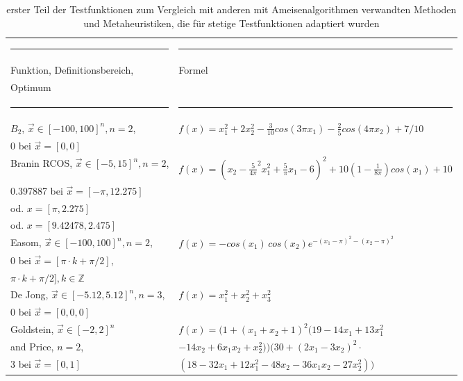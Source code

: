 \documentclass[fontsize=12, a4aper]{scrartcl}
\newcommand\Tstrut{\rule{0pt}{3ex}}           %
\begin{document}
	\begin{table}[H]
		
		\fontsize{10pt}{12pt}
		
		\caption{erster Teil der Testfunktionen zum Vergleich mit anderen mit Ameisenalgorithmen verwandten Methoden und Metaheuristiken, die für stetige Testfunktionen adaptiert wurden}
		
		\label{subsec:Stetige_Testfunktionen:tab:Teil_1_Stet_Adapt}
		
		\begin{tabularx}{\textwidth}{l|l}
			
			\rule{6cm}{0.4pt} & \rule{9cm}{0.4pt}\\
			
			Funktion, Definitionsbereich, & Formel\\
			Optimum & \\
			
			\rule{6cm}{0.4pt} & \rule{9cm}{0.4pt}\\
			
			\(B_2\), \(\overrightarrow{x} \in [-100,100]^n, n = 2\), & \(f(x)=x_1^2 + 2x_2^2 - \frac{3}{10} cos(3 \pi x_1) -\frac{2}{5} cos(4 \pi x_2) +7/10\)\\
			0 bei \(\overrightarrow{x} = [0, 0]\) &\\
			
			Branin RCOS, \(\overrightarrow{x} \in [-5,15]^n, n = 2\),
			& \(f(x)=(x_2 - \frac{5}{4\pi}^2 x_1^2 + \frac{5}{\pi} x_1 - 6)^2 + 10 (1 - \frac{1}{8\pi})cos(x_1) + 10\)\Tstrut\\
			0.397887 bei \(\overrightarrow{x} = [-\pi , 12.275]\) & \\
			od. \(x = [\pi , 2.275]\) & \\
			od. \(x = [9.42478, 2.475]\) & \\
			
			Easom, \(\overrightarrow{x} \in [-100,100]^n, n = 2\), & \(f(x)=-cos(x_1) \, cos(x_2) e^{-(x_1-\pi)^2 - (x_2-\pi)^2}\)\Tstrut\\
			0 bei \(\overrightarrow{x} = [\pi \cdot k + \pi/2]\), & \\
			\( \pi \cdot k + \pi/2], k \in \mathbb{Z}\) & \\
			
			De Jong, \(\overrightarrow{x} \in [-5.12,5.12]^n, n = 3\),
			& \(f(x)=x_1^2 + x_2^2 + x_3^2\)\Tstrut\\
			0 bei \(\overrightarrow{x} = [0, 0, 0]\) &\\
			
			Goldstein, \(\overrightarrow{x} \in [-2,2]^n\) & \(f(x)=(1 + (x_1 + x_2 + 1)^2 (19 - 14x_1 + 13x_1^2\)\Tstrut\\
			and Price, \(n = 2\), & \( - 14x_2 + 6x_1x_2 + x_2^2))(30 + (2x_1 - 3x_2)^2 \cdot\)\\
			3 bei \(\overrightarrow{x} = [0,1]\) & \((18 - 32x_1 + 12x_1^2 - 48x_2 - 36x_1x_2 - 27x_2^2))\)\\
			

\end{tabularx}
\end{table}
\end{document}
